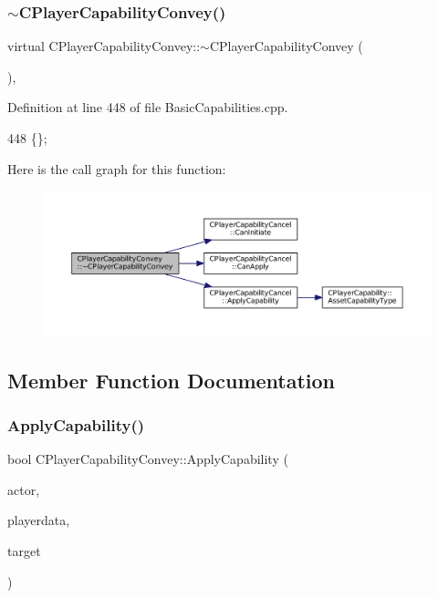 \subsubsection{\texorpdfstring{$\sim$\+C\+Player\+Capability\+Convey()}{~CPlayerCapabilityConvey()}}
{\footnotesize\ttfamily virtual C\+Player\+Capability\+Convey\+::$\sim$\+C\+Player\+Capability\+Convey (\begin{DoxyParamCaption}{ }\end{DoxyParamCaption})\hspace{0.3cm}{\ttfamily [inline]}, {\ttfamily [virtual]}}



Definition at line 448 of file Basic\+Capabilities.\+cpp.


\begin{DoxyCode}
448 \{\};
\end{DoxyCode}
Here is the call graph for this function\+:\nopagebreak
\begin{figure}[H]
\begin{center}
\leavevmode
\includegraphics[width=350pt]{classCPlayerCapabilityConvey_a687e07da4e0f552bd0629183c407229f_cgraph}
\end{center}
\end{figure}


\subsection{Member Function Documentation}
\hypertarget{classCPlayerCapabilityConvey_ad05e5ab950872e685fb9449592f7f5a9}{}\label{classCPlayerCapabilityConvey_ad05e5ab950872e685fb9449592f7f5a9} 
\subsubsection{\texorpdfstring{Apply\+Capability()}{ApplyCapability()}}
{\footnotesize\ttfamily bool C\+Player\+Capability\+Convey\+::\+Apply\+Capability (\begin{DoxyParamCaption}\item[{std\+::shared\+\_\+ptr$<$ \hyperlink{classCPlayerAsset}{C\+Player\+Asset} $>$}]{actor,  }\item[{std\+::shared\+\_\+ptr$<$ \hyperlink{classCPlayerData}{C\+Player\+Data} $>$}]{playerdata,  }\item[{std\+::shared\+\_\+ptr$<$ \hyperlink{classCPlayerAsset}{C\+Player\+Asset} $>$}]{target }\end{DoxyParamCaption})\hspace{0.3cm}{\ttfamily [virtual]}}



